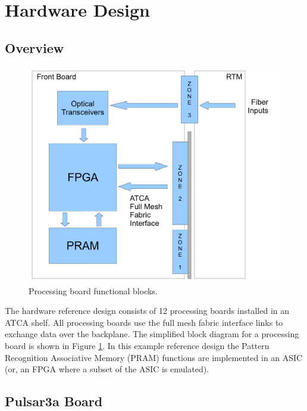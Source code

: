 \documentclass[letterpaper]{article}
\begin{document}
\section{Hardware Design}

\subsection{Overview}

\begin{figure}
\centering
\includegraphics[width=16cm]{hwblock.png}
\caption{Processing board functional blocks.}
\label{hwblock}
\end{figure}

The hardware reference design consists of 12 processing boards installed in an ATCA shelf.  All processing boards use the full mesh fabric interface links to exchange data over the backplane.  The simplified block diagram for a processing board is shown in Figure \ref{hwblock}.  In this example reference design the Pattern Recognition Associative Memory (PRAM) functions are implemented in an ASIC (or, an FPGA where a subset of the ASIC is emulated).

\subsection{Pulsar3a Board}
\end{document}
